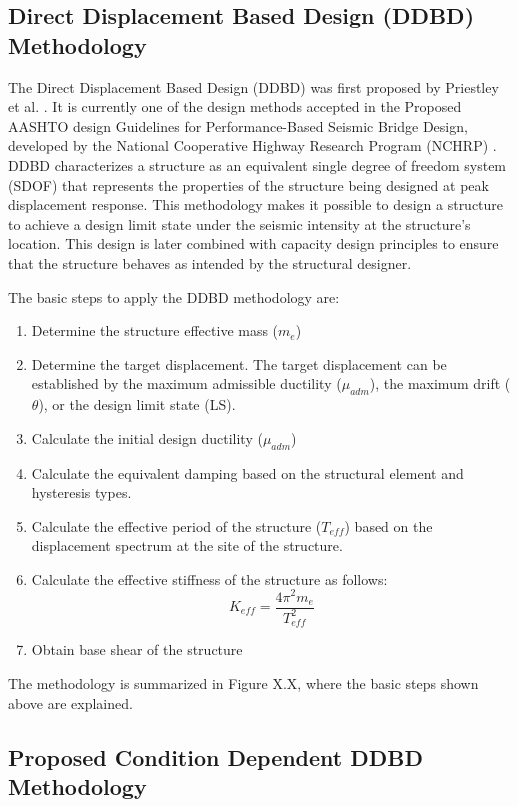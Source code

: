 \subsection{Direct Displacement Based Design (DDBD) Methodology}
The Direct Displacement Based Design (DDBD) was first proposed by Priestley et al. \cite{Priestley2007}. It is currently one of the design methods accepted in the Proposed AASHTO design Guidelines for Performance-Based Seismic Bridge Design, developed by the National Cooperative Highway Research Program (NCHRP) \cite{NCHRP2020}. DDBD characterizes a structure as an equivalent single degree of freedom system (SDOF) that represents the properties of the structure being designed at peak displacement response. This methodology makes it possible to design a structure to achieve a design limit state under the seismic intensity at the structure's location. This design is later combined with capacity design principles to ensure that the structure behaves as intended by the structural designer. 

The basic steps to apply the DDBD methodology are:
\begin{enumerate}
    \item Determine the structure effective mass ($m_{e}$)
    \item Determine the target displacement. The target displacement can be established by the maximum admissible ductility ($\mu_{adm}$), the maximum drift ($\theta$), or the design limit state (LS).
    \item Calculate the initial design ductility ($\mu_{adm}$)
    \item Calculate the equivalent damping based on the structural element and hysteresis types.
    \item Calculate the effective period of the structure ($T_{eff}$) based on the displacement spectrum at the site of the structure.
    \item Calculate the effective stiffness of the structure as follows:
    \begin{equation}
        K_{eff}=\frac{4\pi^2 m_{e}}{T_{eff}^ 2}
    \end{equation}
    \item Obtain base shear of the structure
\end{enumerate}

The methodology is summarized in Figure X.X, where the basic steps shown above are explained.

\subsection{Proposed Condition Dependent DDBD Methodology}

